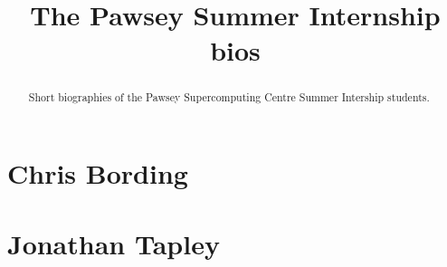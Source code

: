 \documentclass[11pt,a4paper]{report}
\title{The Pawsey Summer Internship bios}
\begin{document}
\maketitle
\tableofcontents


\begin{abstract}

Short biographies of the Pawsey Supercomputing Centre Summer Intership students.

\end{abstract}

\chapter{Chris Bording}


\chapter{Jonathan Tapley}

\end{document}
